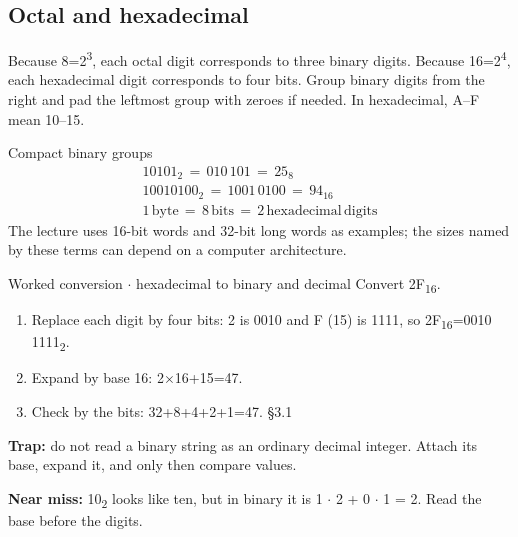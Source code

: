 \documentclass[11pt]{article}
\begin{document}
\begin{keepsection}
\begin{keepsection}
\subsection{Octal and hexadecimal}

Because 8=2\textsuperscript{3}, each octal digit corresponds to three binary digits. Because 16=2\textsuperscript{4}, each hexadecimal digit corresponds to four bits. Group binary digits from the right and pad the leftmost group with zeroes if needed. In hexadecimal, A–F mean 10–15.

\begin{equationcard}{Compact binary groups}
\[ \begin{gathered} 10101_{2}\, =\, 010\, 101\, =\, 25_{8} \\ 10010100_{2}\, =\, 1001\, 0100\, =\, 94_{16} \\ 1\, \text{byte}\, =\, 8\, \text{bits}\, =\, 2\, \text{hexadecimal}\, \text{digits} \end{gathered} \]
{\small The lecture uses 16-bit words and 32-bit long words as examples; the sizes named by these terms can depend on a computer architecture.}
\end{equationcard}

\begin{workedbox}{Worked conversion \ensuremath{\cdot} hexadecimal to binary and decimal}
Convert 2F\textsubscript{16}.

\begin{enumerate}
\item Replace each digit by four bits: 2 is 0010 and F (15) is 1111, so 2F\textsubscript{16}=0010 1111\textsubscript{2}.
\item Expand by base 16: 2\ensuremath{\times}16+15=47.
\item Check by the bits: 32+8+4+2+1=47. \hfill{\small\color{FAUblue}§3.1}
\end{enumerate}
\end{workedbox}

\begin{notebox}\textbf{Trap:} do not read a binary string as an ordinary decimal integer. Attach its base, expand it, and only then compare values.\end{notebox}

\begin{notebox}\textbf{Near miss:} 10\textsubscript{2} looks like ten, but in binary it is 1 \ensuremath{\cdot} 2 + 0 \ensuremath{\cdot} 1 = 2. Read the base before the digits.\end{notebox}


\end{keepsection}
\end{keepsection}
\end{document}

